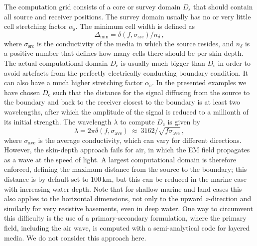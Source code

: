 \documentclass[extra, camera,%
    onecolumn,   %
    referee,     %
]{gji}
\newcommand{\mr}[1]{\mathrm{#1}}
\begin{document}
The computation grid consists of a core or survey domain $D_\mr{s}$ that should
contain all source and receiver positions. The survey domain usually has no or
very little cell stretching factor $\alpha_\mr{s}$. The minimum cell width is
defined as
%
\begin{equation}
  \Delta_\mr{min}=\delta(f, \sigma_\mr{src})/n_\delta \, ,
  \label{eq:minwidth}
\end{equation}
%
where $\sigma_\mr{src}$ is the conductivity of the media in which the source
resides, and $n_\delta$ is a positive number that defines how many cells there
should be per skin depth. The actual computational domain $D_\mr{c}$ is usually
much bigger than $D_\mr{s}$ in order to avoid artefacts from the perfectly
electrically conducting boundary condition. It can also have a much higher
stretching factor $\alpha_\mr{c}$. In the presented examples we have chosen
$D_\mr{c}$ such that the distance for the signal diffusing from the source to
the boundary and back to the receiver closest to the boundary is at least two
wavelengths, after which the amplitude of the signal is reduced to a millionth
of its initial strength. The wavelength $\lambda$ to compute $D_\mr{c}$ is
given by
%
\begin{equation}
  \lambda = 2\pi\delta(f, \sigma_\mr{ave})
  \ \approx \ 3162/\sqrt{f\sigma_\mr{ave}}\, ,
 \label{eq:lambda}
\end{equation}
%
where $\sigma_\mr{ave}$ is the average conductivity, which can vary for
different directions. However, the skin-depth approach fails for air, in which
the EM field propagates as a wave at the speed of light. A largest
computational domain is therefore enforced, defining the maximum distance from
the source to the boundary; this distance is by default set to 100\,km, but
this can be reduced in the marine case with increasing water depth. Note that
for shallow marine and land cases this also applies to the horizontal
dimensions, not only to the upward $z$-direction and similarly for very
resistive basements, even in deep water. One way to circumvent this difficulty
is the use of a primary-secondary formulation, where the primary field,
including the air wave, is computed with a semi-analytical code for layered
media. We do not consider this approach here. 
\end{document}
